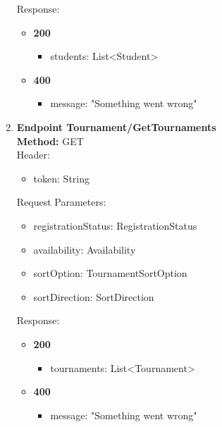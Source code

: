 \begin{enumerate}
\begin{itemize}
    \end{itemize}
    Response:\\
    \begin{itemize}
        \item \textbf{200} \\
        \begin{itemize}
            \item students: List<Student>
        \end{itemize}
        \item \textbf{400} \\
        \begin{itemize}
            \item message: "Something went wrong"
        \end{itemize}
    \end{itemize}
    \item \textbf{Endpoint Tournament/GetTournaments} \\
    \textbf{Method:} GET \\
    Header:\\
    \begin{itemize}
        \item token: String
    \end{itemize}
    Request Parameters: \\
    \begin{itemize}
        \item registrationStatus: RegistrationStatus
        \item availability: Availability
        \item sortOption: TournamentSortOption
        \item sortDirection: SortDirection
    \end{itemize}
    Response:\\
    \begin{itemize}
        \item \textbf{200} \\
        \begin{itemize}
            \item tournaments: List<Tournament>
        \end{itemize}
        \item \textbf{400} \\
        \begin{itemize}
            \item message: "Something went wrong"
        \end{itemize}

\end{itemize}
\end{enumerate}
